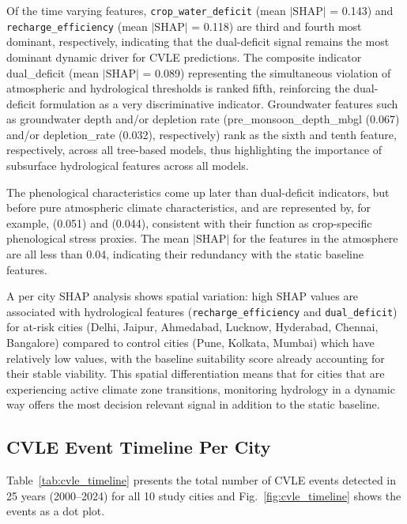 \documentclass{ieeeaccess}
\begin{document}
Of the time varying features, \texttt{crop\_water\_deficit} (mean $|\text{SHAP}|$ = 0.143) and \texttt{recharge\_efficiency} (mean $|\text{SHAP}|$ = 0.118) are third and fourth most dominant, respectively, indicating that the dual-deficit signal remains the most dominant dynamic driver for CVLE predictions. The composite indicator dual\_deficit (mean $|\text{SHAP}|$ = 0.089) representing the simultaneous violation of atmospheric and hydrological thresholds is ranked fifth, reinforcing the dual-deficit formulation as a very discriminative indicator. Groundwater features such as groundwater depth and/or depletion rate (pre\_monsoon\_depth\_mbgl (0.067) and/or depletion\_rate (0.032), respectively) rank as the sixth and tenth feature, respectively, across all tree-based models, thus highlighting the importance of subsurface hydrological features across all models.

The phenological characteristics come up later than dual-deficit indicators, but before pure atmospheric climate characteristics, and are represented by, for example,  (0.051) and  (0.044), consistent with their function as crop-specific phenological stress proxies. The mean $\lvert \text{SHAP} \rvert$ for the features in the atmosphere are all less than 0.04, indicating their redundancy with the static baseline features.

A per city SHAP analysis shows spatial variation: high SHAP values are associated with hydrological features (\texttt{recharge\_efficiency} and \texttt{dual\_deficit}) for at-risk cities (Delhi, Jaipur, Ahmedabad, Lucknow, Hyderabad, Chennai, Bangalore) compared to control cities (Pune, Kolkata, Mumbai) which have relatively low values, with the baseline suitability score already accounting for their stable viability. This spatial differentiation means that for cities that are experiencing active climate zone transitions, monitoring hydrology in a dynamic way offers the most decision relevant signal in addition to the static baseline.

\subsection{CVLE Event Timeline Per City}

Table~\ref{tab:cvle_timeline} presents the total number of CVLE events detected in 25 years (2000–2024) for all 10 study cities and Fig.~\ref{fig:cvle_timeline} shows the events as a dot plot.
\end{document}
